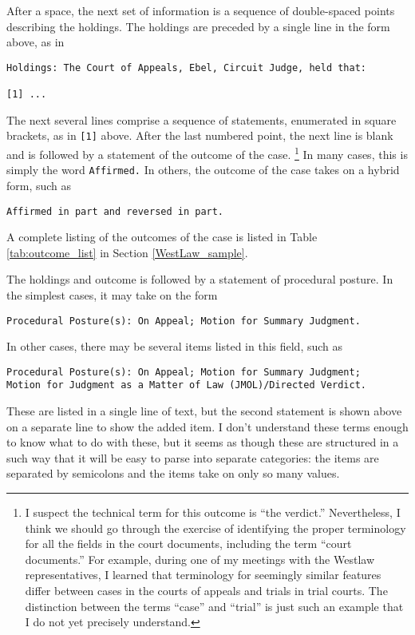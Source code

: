 \documentclass[11pt]{paper}
\begin{document}
After a space, the next set of information is a sequence of double-spaced 
points describing the holdings. 
The holdings are preceded by a single line in the form above, as in 
% 
\begin{verbatim}
Holdings: The Court of Appeals, Ebel, Circuit Judge, held that:

[1] ...
\end{verbatim}
% 
The next several lines comprise a sequence of statements, enumerated in square 
brackets, as in \texttt{[1]} above. 
After the last numbered point, the next line is blank and is followed by a 
statement of the outcome of the case.%
\footnote{I suspect the technical term for this outcome is ``the verdict.'' 
          Nevertheless, I think we should go through the exercise 
          of identifying the proper terminology for all the fields 
          in the court documents, including the term ``court documents.''
          For example, during one of my meetings with the Westlaw 
	  representatives, I learned that terminology for seemingly similar 
	  features differ between cases in the courts of appeals and trials 
	  in trial courts. 
          The distinction between the terms ``case'' and ``trial'' is just 
	  such an example that I do not yet precisely understand.
	 } 
In many cases, this is simply the word \texttt{Affirmed.}
In others, the outcome of the case takes on a hybrid form, such as
% 
\begin{verbatim}
Affirmed in part and reversed in part.
\end{verbatim}
% 
A complete listing of the outcomes of the case is listed in 
Table \ref{tab:outcome_list} in Section \ref{WestLaw_sample}. 



The holdings and outcome is followed by a statement of procedural posture. 
In the simplest cases, it may take on the form
\begin{verbatim}
Procedural Posture(s): On Appeal; Motion for Summary Judgment.
\end{verbatim}
% 
In other cases, there may be several items listed in this field, such as
\begin{verbatim}
Procedural Posture(s): On Appeal; Motion for Summary Judgment; 
Motion for Judgment as a Matter of Law (JMOL)/Directed Verdict.
\end{verbatim}
% 
These are listed in a single line of text, but the second statement is shown 
above on a separate line to show the added item. 
I don't understand these terms enough to know what to do with these, but it 
seems as though these are structured in a such way that it will be easy 
to parse into separate categories: the items are separated by semicolons 
and the items take on only so many values. 
\end{document}
